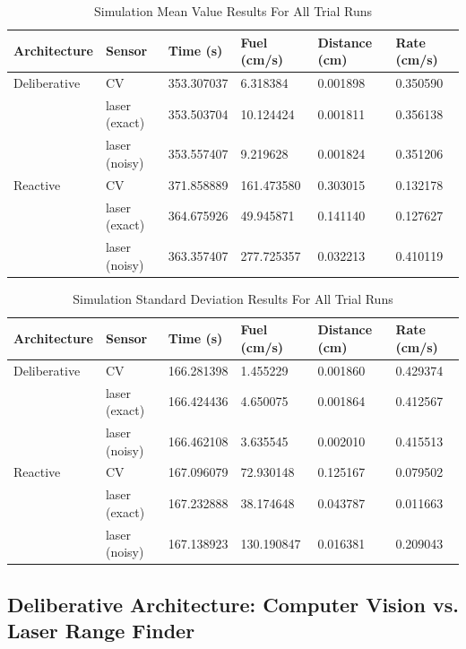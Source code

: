 \documentclass[journal, 10pt]{IEEEtran}
\begin{document}
\begin{table}
\centering
\normalsize
\caption{Simulation Mean Value Results For All Trial Runs}
\begin{tabular}{llllll}
\toprule
Architecture & Sensor & Time (s) & Fuel (cm/s) & Distance (cm) & Rate (cm/s) \\
\midrule
Deliberative & CV & 353.307037  & 6.318384 & 0.001898 & 0.350590\\
			& laser (exact) & 353.503704 & 10.124424 & 0.001811 & 0.356138\\
			& laser (noisy) & 353.557407   & 9.219628 & 0.001824 & 0.351206\\
Reactive & CV & 371.858889  & 161.473580 & 0.303015 & 0.132178\\
& laser (exact) & 364.675926 & 49.945871 & 0.141140 & 0.127627\\
& laser (noisy) &  363.357407 & 277.725357 & 0.032213 & 0.410119 \\

\bottomrule
\end{tabular}
\label{mean}
\end{table}

\begin{table}
\centering
\normalsize
\caption{Simulation Standard Deviation Results For All Trial Runs}
\begin{tabular}{llllll}
\toprule
Architecture & Sensor & Time (s) & Fuel (cm/s) & Distance (cm) & Rate (cm/s)\\
\midrule
Deliberative & CV & 166.281398 &  1.455229 & 0.001860 & 0.429374\\
			& laser (exact) & 166.424436 & 4.650075 & 0.001864 & 0.412567\\			
& laser (noisy) & 166.462108 &  3.635545 & 0.002010 & 0.415513\\
Reactive & CV & 167.096079 & 72.930148 & 0.125167 & 0.079502\\
& laser (exact) & 167.232888 & 38.174648 & 0.043787 & 0.011663 \\
& laser (noisy) & 167.138923 & 130.190847 & 0.016381 & 0.209043 \\
\bottomrule
\end{tabular}
\label{std_dev}
\end{table}

 


\subsection{Deliberative Architecture: Computer Vision vs. Laser Range Finder}
\end{document}
